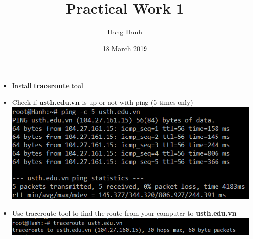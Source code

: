 \documentclass{article}
\title{Practical Work 1}
\author {Hong Hanh}
\date{18 March 2019}
\begin{document}
\maketitle

\begin{itemize}
    \item Install \textbf{traceroute} tool
    \item Check if \textbf{usth.edu.vn} is up or not with ping (5 times only)\\
    \includegraphics[scale=1.0]{ping.PNG}
    \item Use traceroute tool to find the route from your computer to
\textbf{usth.edu.vn}\\
    \includegraphics[scale=0.85]{traceroute.PNG}
\end{itemize}
\end{document}
